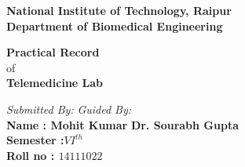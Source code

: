 \documentclass[12pt]{article}
\begin{document}
	\begin{center}
		\begin{Large}
			\textbf{National Institute of Technology, Raipur}\\
			\bigskip
			\textbf{Department of Biomedical Engineering }\\
		\end{Large}
	\end{center}
	\begin{Large}
		\begin{center}
			\textbf{Practical Record }\\
			of\\
			 \textbf{Telemedicine Lab }\\
		\end{center}
	\end{Large}
	\vspace{5cm}
	
	\begin{Large}
		\begin{flushleft}
			\textit{Submitted By:}  \hspace{5.2cm} \textit{Guided By:}\\
			\textbf{Name : Mohit Kumar}  \hspace{2.5cm} \textbf{Dr. Sourabh Gupta}\\
			\textbf{Semester :$VI^{th}$}  \hspace{9cm} \\
			\textbf{Roll no : $14111022$ }  
			
		\end{flushleft} 
	\end{Large} 
\end{document}
